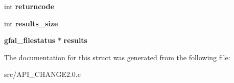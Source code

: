 \begin{DoxyCompactItemize}
\item 
int {\bfseries returncode}\label{structgfal__handle___a31160334e9abc3b407d6e2f38dc77932}

\item 
int {\bfseries results\_\-size}\label{structgfal__handle___a76cd86e4166c2ee54d43c92c70667028}

\item 
{\bf gfal\_\-filestatus} $\ast$ {\bfseries results}\label{structgfal__handle___a362963b5dfa6b6271eabe5bbe6cacd02}

\end{DoxyCompactItemize}


The documentation for this struct was generated from the following file:\begin{DoxyCompactItemize}
\item 
src/API\_\-CHANGE2.0.c\end{DoxyCompactItemize}
